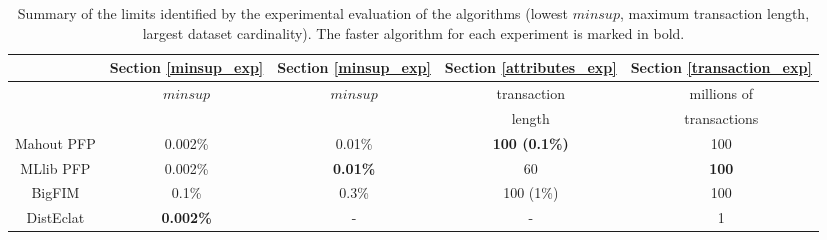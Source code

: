 
\begin{table*}[h!]
\scriptsize
\begin{center}
\caption{
Summary of the limits identified by the experimental evaluation of the
algorithms (lowest $minsup$, maximum transaction length,
largest dataset cardinality).
The faster algorithm for each experiment is marked in bold.
}
\label{all_resume}
\begin{tabular}{|c|c|c|c|c|}
\hline
& Section \ref{minsup_exp} & Section \ref{minsup_exp} & Section \ref{attributes_exp}& Section  \ref{transaction_exp} \\ \hline
           & $minsup$ & $minsup$ & transaction  & millions of   \\
           &          &          & length       & transactions  \\ \hline
Mahout PFP & 0.002\% & 0.01\%    & \textbf{100 (0.1\%)}          & 100 		\\ \hline
MLlib PFP  & 0.002\% & \textbf{0.01\%}   & 60		& \textbf{100} 	\\ \hline
BigFIM     & 0.1\%   & 0.3\%     & 100 (1\%) 	& 100 		\\ \hline
DistEclat  & \textbf{0.002\%}& - 	 & - 		& 1 		\\ \hline
\end{tabular}
\end{center}
\end{table*}

